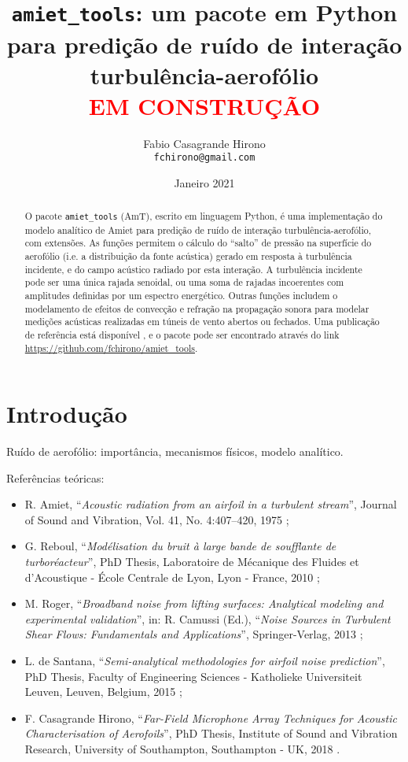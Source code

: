 \documentclass[a4paper, 11pt, twoside]{article}
\author{Fabio Casagrande Hirono \\ \texttt{fchirono@gmail.com}}
\title{\texttt{amiet\_tools}: um pacote em Python para predição de ruído de interação turbulência-aerofólio\\\textcolor{red}{EM CONSTRUÇÃO}}
\date{Janeiro 2021}
\begin{document}
\maketitle

\begin{abstract}
	O pacote \verb|amiet_tools| (AmT), escrito em linguagem Python, é uma implementação do modelo analítico de Amiet \cite{Amiet75} para predição de ruído de interação turbulência-aerofólio, com extensões. As funções permitem o cálculo do ``salto'' de pressão na superfície do aerofólio (i.e. a distribuição da fonte acústica) gerado em resposta à turbulência incidente, e do campo acústico radiado por esta interação. A turbulência incidente pode ser uma única rajada senoidal, ou uma soma de rajadas incoerentes com amplitudes definidas por um espectro energético. Outras funções includem o modelamento de efeitos de convecção e refração na propagação sonora para modelar medições acústicas realizadas em túneis de vento abertos ou fechados. Uma publicação de referência está disponível \cite{Casagrande_etal2020}, e o pacote pode ser encontrado através do link \url{https://github.com/fchirono/amiet_tools}.
\end{abstract}

\section{Introdução}

Ruído de aerofólio: importância, mecanismos físicos, modelo analítico.

Referências teóricas:

\begin{itemize}
	\item R. Amiet, ``\emph{Acoustic radiation from an airfoil in a turbulent stream}'', Journal of Sound and Vibration, Vol. 41, No. 4:407–420, 1975 \cite{Amiet75};
	
	\item G. Reboul, ``\emph{Modélisation du bruit à large bande de soufflante de turboréacteur}'', PhD Thesis, Laboratoire de Mécanique des Fluides et d’Acoustique - École Centrale de Lyon, Lyon - France, 2010 \cite{Reboul10};
	
	\item M. Roger, ``\emph{Broadband noise from lifting surfaces: Analytical modeling and experimental validation}'', in: R. Camussi (Ed.), ``\emph{Noise Sources in Turbulent Shear Flows: Fundamentals and Applications}'', Springer-Verlag, 2013 \cite{Roger13};
	
	\item L. de Santana, ``\emph{Semi-analytical methodologies for airfoil noise prediction}'', PhD Thesis, Faculty of Engineering Sciences - Katholieke Universiteit Leuven, Leuven, Belgium, 2015 \cite{deSantana2015};
	
	\item F. Casagrande Hirono, ``\emph{Far-Field Microphone Array Techniques for Acoustic Characterisation of Aerofoils}'', PhD Thesis, Institute of Sound and Vibration Research, University of Southampton, Southampton - UK, 2018 \cite{Casagrande18}.
\end{itemize}
\end{document}
